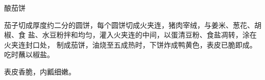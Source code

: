 \begin{recipe}{酿茄饼}

\ingredients


\cooking

茄子切成厚度约二分的圆饼，每个圆饼切成火夹连，猪肉宰绒，与姜米、葱花、胡椒、食
盐、水豆粉拌和均匀，灌入火夹连的中间，以蛋清豆粉、食盐凋转，涂在火夹连封口处，
制成茄饼，油烧至五成热时，下饼炸成鸭黄色，表皮已脆即成。吃时蘸以椒盐。

\notes

表皮香脆，内瓤细嫩。

\end{recipe}


